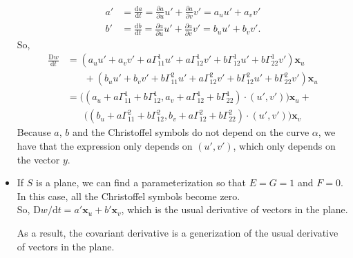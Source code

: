 \documentclass[10pt]{article}
\newcommand{\dee}{\mathrm{d}}
\newcommand{\Dee}{\mathrm{D}}
\newcommand{\ve}[1]{\mathbf{#1}}
\begin{document}
\begin{itemize}
\begin{align*}
      a' &= \frac{\dee a}{\dee t} = \frac{\partial a}{\partial u} u'+ \frac{\partial a}{\partial v} v' = a_u u' + a_v v'\\
      b' &= \frac{\dee b}{\dee t} = \frac{\partial a}{\partial u} u'+ \frac{\partial a}{\partial v} v' = b_u u' + b_v v'.
    \end{align*}
    So,
    \begin{align*}
      \frac{\Dee w}{\dee t} 
      &= (a_u u' + a_v v' + a \Gamma_{11}^1 u' + a \Gamma_{12}^1 v' + b \Gamma^1_{12} u' + b \Gamma^1_{22} v') \ve{x}_u\\
      & \phantom{\ = \ } + (b_u u' + b_v v' + b \Gamma_{11}^2 u' + a \Gamma_{12}^2 v' + b \Gamma^2_{12} u' + b \Gamma^2_{22} v') \ve{x}_u\\
      &= \big( (a_u + a\Gamma_{11}^1 + b \Gamma_{12}^1, a_v + a \Gamma_{12}^1 + b\Gamma_{22}^1) \cdot (u',v') \big) \ve{x}_u + \\
      & \phantom{\ = \ } \big( (b_u + a\Gamma_{11}^2 + b \Gamma_{12}^2, b_v + a \Gamma_{12}^2 + b\Gamma_{22}^2) \cdot (u',v') \big) \ve{x}_v
    \end{align*}
    Because $a$, $b$ and the Christoffel symbols do not depend on the curve $\alpha$, we have that the expression only depends on $(u',v')$, which only depends on the vector $y$.

    \item If $S$ is a plane, we can find a parameterization so that $E = G = 1$ and $F = 0$.\\
    In this case, all the Christoffel symbols become zero.\\
    So, $\Dee w/\dee t = a' \ve{x}_u + b' \ve{x}_v$, which is the usual derivative of vectors in the plane.

    As a result, the covariant derivative is a generization of the usual derivative of vectors in the plane.
  \end{itemize}
\end{document}
